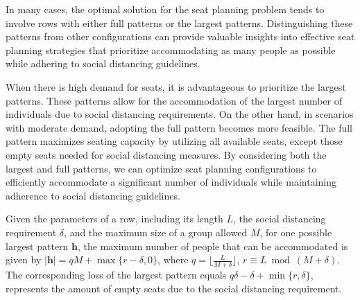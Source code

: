 

In many cases, the optimal solution for the seat planning problem tends to involve rows with either full patterns or the largest patterns. Distinguishing these patterns from other configurations can provide valuable insights into effective seat planning strategies that prioritize accommodating as many people as possible while adhering to social distancing guidelines.

When there is high demand for seats, it is advantageous to prioritize the largest patterns. These patterns allow for the accommodation of the largest number of individuals due to social distancing requirements. On the other hand, in scenarios with moderate demand, adopting the full pattern becomes more feasible. The full pattern maximizes seating capacity by utilizing all available seats, except those empty seats needed for social distancing measures. By considering both the largest and full patterns, we can optimize seat planning configurations to efficiently accommodate a significant number of individuals while maintaining adherence to social distancing guidelines. 



\begin{prop}\label{lem_pattern}
Given the parameters of a row, including its length $L$, the social distancing requirement $\delta$, and the maximum size of a group allowed $M$, for one possible largest pattern $\bm{h}$, the maximum number of people that can be accommodated is given by $|\bm{h}| = qM + \max\{r-\delta, 0\}$, where $q = \lfloor \frac{L}{M + \delta} \rfloor$, $r \equiv L \bmod (M + \delta)$. The corresponding loss of the largest pattern equals $q \delta - \delta + \min\{r, \delta\}$, represents the amount of empty seats due to the social distancing requirement. 
\end{prop}

